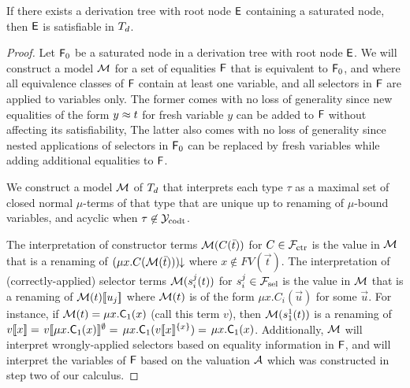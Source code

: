 \begin{lemma}%
\label{lem:ss}%
\afterDot
If there exists a derivation tree with root node $\mathsf{E}$ containing a saturated node, then $\mathsf{E}$ is satisfiable in $T_{d}$.
\end{lemma}
\begin{proof}
Let $\mathsf{F}_0$ be a saturated node in a derivation tree with root node $\mathsf{E}$.
We will construct a model $\mathcal{M}$ for a set of equalities $\mathsf{F}$ that is equivalent to $\mathsf{F}_0$, and where 
all equivalence classes of $\mathsf{F}$ contain at least one variable, and all selectors in $\mathsf{F}$ are applied to variables only.
The former comes with no loss of generality since new equalities of the form $y \approx t$ for fresh variable $y$ can be added to $\mathsf{F}$ without affecting its satisfiability,
The latter also comes with no loss of generality since nested applications of selectors in $\mathsf{F}_0$ can be replaced by fresh variables while adding additional equalities to $\mathsf{F}$.

We construct a model $\mathcal{M}$ of $T_{d}$ that interprets each type $\tau$
as a maximal set of closed normal $\mu$-terms of that type that are 
unique up to renaming of $\mu$-bound variables,
and acyclic when $\tau \not\in \mathcal{Y}_{\mathrm{codt}}$.


The interpretation of constructor terms
$\mathcal{M}( C( \bar t ) )$ for $C \in \mathcal{F}_{\mathrm{ctr}}$ is the value in $\mathcal{M}$ that is a renaming of ${(\mu x. C( \mathcal{M}( \bar t ) ))}\!\!\downarrow$ where $x \not\in FV( \vec t )$.
The interpretation of (correctly-applied) selector terms
$\mathcal{M}( s^j_i( t ) )$ for $s^j_i \in \mathcal{F}_{\mathrm{sel}}$ is the value in $\mathcal{M}$ that is a renaming of $\mathcal{M}( t )[\![ u_j ]\!]$
where $\mathcal{M}( t )$ is of the form $\mu x. C_i( \vec u )$ for some $\vec u$.
For instance, if $\mathcal{M}( t ) = \mu x. \textsf{C}_1( x )$ (call this term $v$), 
then $\mathcal{M}( s_1^1( t ) )$ is a renaming of
$v[\![ x ]\!] =$ 
$v[\![ \mu x. \textsf{C}_1( x ) ]\!]^\emptyset =$
$\mu x. \textsf{C}_1( v[\![ x ]\!]^{\{x\}} ) =$
$\mu x. \textsf{C}_1( x )$.
Additionally, $\mathcal{M}$ will interpret wrongly-applied selectors based on equality information in $\mathsf{F}$,
and will interpret the variables of $\mathsf{F}$ based on the valuation $\mathcal{A}$ which was constructed in step two of our calculus.


\end{proof}
